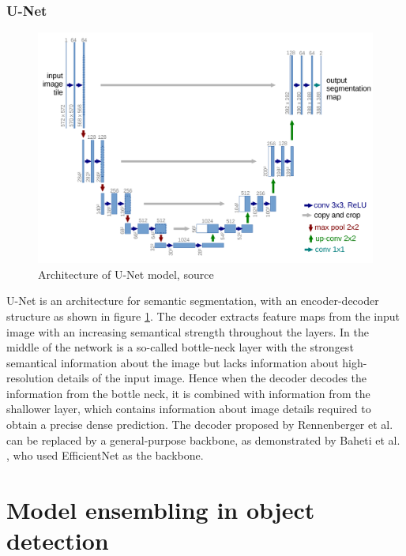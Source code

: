 \subsubsection{U-Net}
\begin{figure}
    \centering
    \includegraphics[width=\linewidth]{images/U-Net.png}
    \caption{Architecture of U-Net model, source \cite{Ronneberger2015}}
    \label{fig:unet_architecture}
\end{figure}
U-Net is an architecture for semantic segmentation, with an encoder-decoder structure as shown in figure \ref{fig:unet_architecture}. The decoder extracts feature maps from the input image with an increasing semantical strength throughout the layers. In the middle of the network is a so-called bottle-neck layer with the strongest semantical information about the image but lacks information about high-resolution details of the input image. Hence when the decoder decodes the information from the bottle neck, it is combined with information from the shallower layer, which contains information about image details required to obtain a precise dense prediction.
\newline
The decoder proposed by Rennenberger et al. \cite{Ronneberger2015} can be replaced by a general-purpose backbone, as demonstrated by Baheti et al. \cite{Baheti2020}, who used EfficientNet as the backbone.

\section{Model ensembling in object detection}

